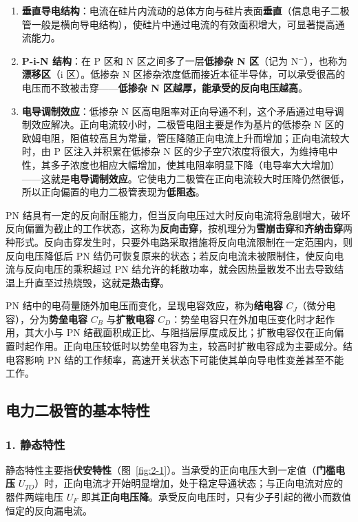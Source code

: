 \begin{enumerate}
  \item \textbf{垂直导电结构}：电流在硅片内流动的总体方向与硅片表面\textbf{垂直}（信息电子二极管一般是横向导电结构），使硅片中通过电流的有效面积增大，可显著提高通流能力。
  \item \textbf{P-i-N 结构}：在 P 区和 N 区之间多了一层\textbf{低掺杂 N 区}（记为 N$^-$），也称为\textbf{漂移区}（i 区）。低掺杂 N 区掺杂浓度低而接近本征半导体，可以承受很高的电压而不致被击穿——\textbf{低掺杂 N 区越厚，能承受的反向电压越高}。
  \item \textbf{电导调制效应}：低掺杂 N 区高电阻率对正向导通不利，这个矛盾通过电导调制效应解决。正向电流较小时，二极管电阻主要是作为基片的低掺杂 N 区的欧姆电阻，阻值较高且为常量，管压降随正向电流上升而增加；正向电流较大时，由 P 区注入并积累在低掺杂 N 区的少子空穴浓度将很大，为维持电中性，其多子浓度也相应大幅增加，使其电阻率明显下降（电导率大大增加）——这就是\textbf{电导调制效应}。它使电力二极管在正向电流较大时压降仍然很低，所以正向偏置的电力二极管表现为\textbf{低阻态}。
\end{enumerate}

PN 结具有一定的反向耐压能力，但当反向电压过大时反向电流将急剧增大，破坏反向偏置为截止的工作状态，这称为\textbf{反向击穿}，按机理分为\textbf{雪崩击穿}和\textbf{齐纳击穿}两种形式。反向击穿发生时，只要外电路采取措施将反向电流限制在一定范围内，则反向电压降低后 PN 结仍可恢复原来的状态；若反向电流未被限制住，使反向电流与反向电压的乘积超过 PN 结允许的耗散功率，就会因热量散发不出去导致结温上升直至过热烧毁，这就是\textbf{热击穿}。

PN 结中的电荷量随外加电压而变化，呈现电容效应，称为\textbf{结电容} $C_J$（微分电容），分为\textbf{势垒电容} $C_B$ 与\textbf{扩散电容} $C_D$：势垒电容只在外加电压变化时才起作用，其大小与 PN 结截面积成正比、与阻挡层厚度成反比；扩散电容仅在正向偏置时起作用。正向电压较低时以势垒电容为主，较高时扩散电容成为主要成分。结电容影响 PN 结的工作频率，高速开关状态下可能使其单向导电性变差甚至不能工作。

\subsection{电力二极管的基本特性}

\subsubsection*{1. 静态特性}

静态特性主要指\textbf{伏安特性}（图~\ref{fig:2-1}）。当承受的正向电压大到一定值（\textbf{门槛电压} $U_{TO}$）时，正向电流才开始明显增加，处于稳定导通状态；与正向电流对应的器件两端电压 $U_F$ 即其\textbf{正向电压降}。承受反向电压时，只有少子引起的微小而数值恒定的反向漏电流。

